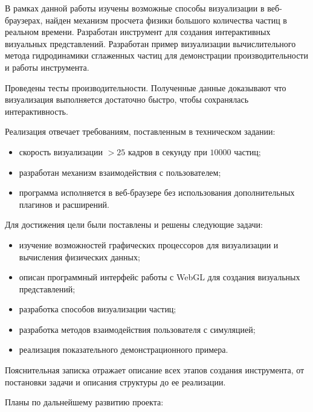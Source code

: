 \newpage
{}

В рамках данной работы изучены возможные способы визуализации в веб-браузерах,
найден механизм просчета физики большого количества частиц в реальном времени.
Разработан инструмент для создания интерактивных визуальных представлений.
Разработан пример визуализации вычислительного метода гидродинамики сглаженных 
частиц для демонстрации производительности и работы инструмента.

Проведены тесты производительности. Полученные данные доказывают что визуализация
выполняется достаточно быстро, чтобы сохранялась интерактивность.

Реализация отвечает требованиям, поставленным в техническом задании:

\begin{itemize}
  \item скорость визуализации $>25$ кадров в секунду при $10000$ частиц;
  \item разработан механизм взаимодействия с пользователем;
  \item программа исполняется в веб-браузере без использования дополнительных 
    плагинов и расширений.
\end{itemize}

Для достижения цели были поставлены и решены следующие задачи:

\begin{itemize}
  \item изучение возможностей графических процессоров для визуализации
    и вычисления физических данных;
  \item описан программный интерфейс работы с WebGL для создания
    визуальных представлений;
  \item разработка способов визуализации частиц;
  \item разработка методов взаимодействия пользователя с симуляцией;
  \item реализация показательного демонстрационного примера.
\end{itemize}

Пояснительная записка отражает описание всех этапов создания инструмента,
от постановки задачи и описания структуры до ее реализации.

Планы по дальнейшему развитию проекта:

